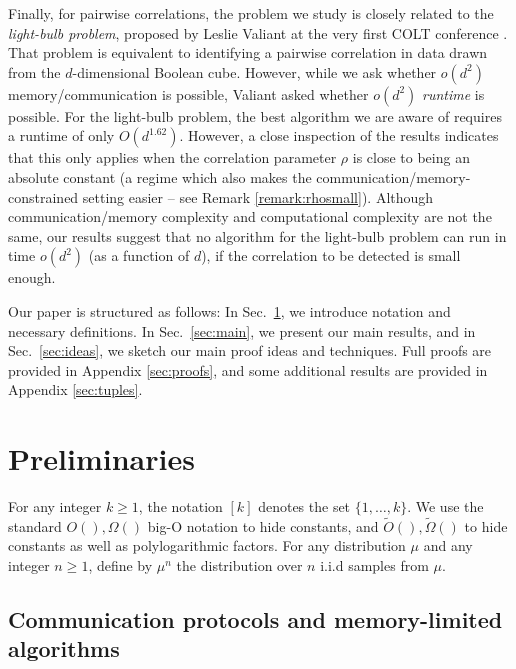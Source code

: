 \documentclass[final, 12pt]{colt2018}
\newcommand{\secref}[1]{Sec.~\ref{#1}}
\begin{document}
Finally, for pairwise correlations, the problem we study is closely related to the \emph{light-bulb problem}, proposed by Leslie Valiant at the very first COLT conference \citep{valiant1988functionality}. That problem is equivalent to 
identifying a pairwise correlation in data drawn from the $d$-dimensional Boolean cube. However, while we ask whether $o(d^2)$
memory/communication is possible, Valiant asked whether $o(d^2)$
\emph{runtime} is possible. For the light-bulb problem, the best 
algorithm we are aware of \citep{valiant2015finding} requires a runtime of only
$O(d^{1.62})$. However, a close inspection of 
the results indicates that this only applies when the correlation parameter 
$\rho$ is close to being an absolute constant (a regime which also makes the 
communication/memory-constrained setting easier -- see Remark 
\ref{remark:rhosmall}). Although communication/memory 
complexity and computational complexity are not the same, our results suggest that no algorithm for the light-bulb problem 
can run in time $o(d^2)$ (as a function of $d$), if the correlation to be detected is small enough. 

Our paper is structured as follows: In \secref{sec:prelim}, we introduce notation and necessary definitions. In \secref{sec:main}, we present our main results, and in \secref{sec:ideas}, we sketch our main proof ideas and techniques. Full proofs are provided in Appendix \ref{sec:proofs}, and some additional results are provided in Appendix \ref{sec:tuples}. 

\section{Preliminaries}\label{sec:prelim}

For any integer $k \ge 1$, the notation $[k]$ denotes the set $\{1, \dots, k\}$. We use the standard $O(),\Omega()$ big-O notation to hide constants, and $\tilde{O}(),\tilde{\Omega}()$ to hide constants as well as polylogarithmic factors. For any distribution $\mu$ and any integer $n \ge 1$, define by $\mu^n$ the distribution over $n$ i.i.d samples from $\mu$.

\subsection{Communication protocols and memory-limited algorithms}
\end{document}

